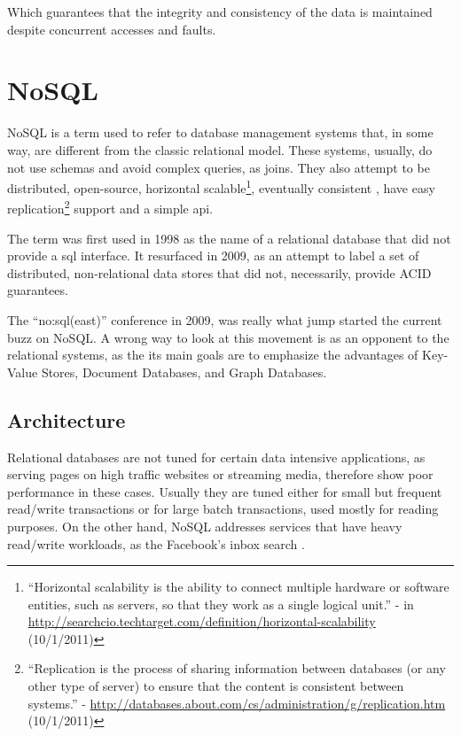 Which guarantees that the integrity and consistency of the data is maintained despite concurrent accesses and faults.  

\section{NoSQL}
\label{sec:nosql}
NoSQL \cite{seeger09} is a term used to refer to database management systems that, in some way, are different from the classic relational model. These systems, usually, do not use schemas and avoid complex queries, as joins. They also attempt to be distributed, open-source, horizontal scalable\footnote{``Horizontal scalability is the ability to connect multiple hardware or software entities, such as servers, so that they work as a single logical unit.'' - in \url{http://searchcio.techtarget.com/definition/horizontal-scalability} (10/1/2011)}, eventually consistent \cite{Vogels2008}, have easy replication\footnote{``Replication is the process of sharing information between databases (or any other type of server) to ensure that the content is consistent between systems.'' - \url{http://databases.about.com/cs/administration/g/replication.htm} (10/1/2011)} support and a simple \ac{api}.

The term was first used in 1998 as the name of a relational database that did not provide a \ac{sql} interface. It resurfaced in 2009, as an attempt to label a set of distributed, non-relational data stores that did not, necessarily, provide ACID guarantees.

The ``no:sql(east)'' conference in 2009, was really what jump started the current buzz on NoSQL. A wrong way to look at this movement is as an opponent to the relational systems, as the its main goals are to emphasize the advantages of Key-Value Stores, Document Databases, and Graph Databases.

\subsection{Architecture}
Relational databases are not tuned for certain data intensive applications, as serving pages on high traffic websites or streaming media, therefore show poor performance in these cases. Usually they are tuned either for small but frequent read/write transactions or for large batch transactions, used mostly for reading purposes. On the other hand, NoSQL addresses services that have heavy read/write workloads, as the Facebook's inbox search \cite{lakshmanMalik}.

